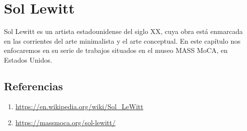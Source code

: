 \documentclass[../principal.tex]{subfiles}
\begin{document}
\chapter{Sol Lewitt}

Sol Lewitt es un artista estadounidense del siglo XX, cuya obra está enmarcada en las corrientes del arte minimalista y el arte conceptual. En este capítulo nos enfocaremos en su serie de trabajos situados en el museo MASS MoCA, en Estados Unidos.

\section{Referencias}

\begin{enumerate}
    \item \url{https://en.wikipedia.org/wiki/Sol_LeWitt}
    \item \url{https://massmoca.org/sol-lewitt/}
\end{enumerate}
\end{document}
